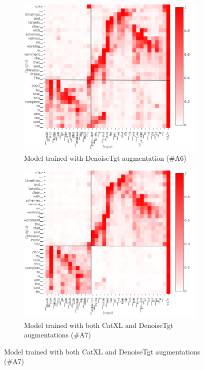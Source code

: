 \begin{figure}[h!tb]
   \vspace{5mm}
   
   \begin{subfigure}[b]{0.49\linewidth}
         \centering
         \includegraphics[width=\linewidth,trim={0mm 3mm 38mm 2mm},clip]{img/robustness/xattn-catXL-denoise-ann.pdf}
         \caption{Model trained with DenoiseTgt augmentation (\#A6)}
         \label{fig:denoise-on-catXL}
      \end{subfigure}
     \begin{subfigure}[b]{0.49\linewidth}
         \centering
         \includegraphics[width=\linewidth,trim={0mm 3mm 38mm 2mm},clip]{img/robustness/xattn-catXL-catXL+denoise-ann.pdf}
         \caption{Model trained with both CatXL and DenoiseTgt augmentations (\#A7)}
         \label{fig:denoise+catXL-on-catXL}
      \end{subfigure}
      

\end{figure}
